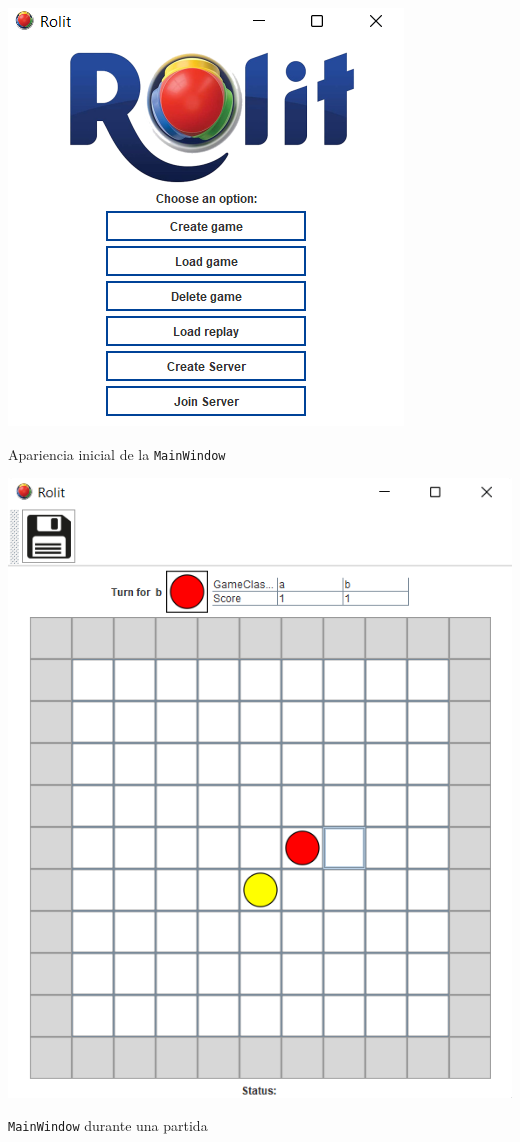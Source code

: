\documentclass[12pt,a4paper,openright]{book}
\theoremstyle{break}
\begin{document}
\begin{center}
\includegraphics[scale=1]{menu-sprint-6.png}

Apariencia inicial de la \texttt{MainWindow}
\end{center}

\begin{center}
\includegraphics[scale=0.9]{partida-sprint-6.png}

\texttt{MainWindow} durante una partida
\end{center}
\end{document}

